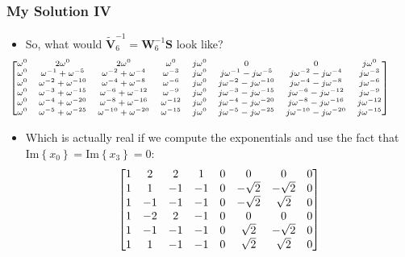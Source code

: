 \documentclass{beamer}
\begin{document}
\begin{frame}
\frametitle{My Solution IV}
\begin{itemize}
    \item So, what would $\tilde{\mathbf{V}}^{-1}_6 = \mathbf{W}^{-1}_6\mathbf{S}$ look like? 
    \begin{equation*}
	\scriptsize
        \hspace{-35pt}
        \begin{bmatrix}
            \omega^0 & 2\omega^0 & 2 \omega^0 & \omega^0 & j\omega^0 & 0 & 0 & j\omega^0 \\
            \omega^0 & \omega^{-1} + \omega^{-5} & \omega^{-2} + \omega^{-4} & \omega^{-3} & j\omega^0 & j\omega^{-1} - j\omega^{-5} &  j\omega^{-2} - j\omega^{-4} & j\omega^{-3} \\
            \omega^0 & \omega^{-2} + \omega^{-10} & \omega^{-4} + \omega^{-8} & \omega^{-6} & j\omega^0 & j\omega^{-2} - j\omega^{-10} &  j\omega^{-4} - j\omega^{-8} & j\omega^{-6} \\
            \omega^0 & \omega^{-3} + \omega^{-15} & \omega^{-6} + \omega^{-12} & \omega^{-9} & j\omega^0 & j\omega^{-3} - j\omega^{-15} &  j\omega^{-6} - j\omega^{-12} & j\omega^{-9} \\
            \omega^0 & \omega^{-4} + \omega^{-20} & \omega^{-8} + \omega^{-16} & \omega^{-12} & j\omega^0 & j\omega^{-4} - j\omega^{-20} &  j\omega^{-8} - j\omega^{-16} & j\omega^{-12} \\
            \omega^0 & \omega^{-5} + \omega^{-25} & \omega^{-10} + \omega^{-20} & \omega^{-15} & j\omega^0 & j\omega^{-5} - j\omega^{-25} &  j\omega^{-10} - j\omega^{-20} & j\omega^{-15} 
        \end{bmatrix}
    \end{equation*}
    \item Which is actually real if we compute the exponentials and use the fact that $\mathrm{Im}\left\{x_0\right\} = \mathrm{Im}\left\{x_3\right\} = 0$:\\
    \begin{equation*}
	\centering
        \begin{bmatrix}
            1 & 2 & 2 & 1 & 0 & 0 & 0 & 0 \\
            1 & 1 & -1 & -1 & 0 & -\sqrt{2} &  -\sqrt{2} & 0 \\
            1 & -1 & -1 & -1 & 0 & -\sqrt{2} & \sqrt{2} & 0 \\
            1 & -2 & 2 & -1 & 0 & 0 &  0 & 0 \\
            1 & -1 & -1 & -1 & 0 & \sqrt{2} & -\sqrt{2} & 0 \\
            1 & 1 & -1 & -1 & 0 & \sqrt{2} & \sqrt{2} & 0 
        \end{bmatrix}
    \end{equation*}
\end{itemize}
\end{frame}
\end{document}
